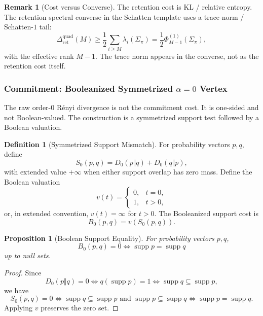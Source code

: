 \documentclass[12pt]{article}
\newtheorem{proposition}[theorem]{Proposition}
\theoremstyle{definition}
\newtheorem{definition}[theorem]{Definition}
\newtheorem{remark}[theorem]{Remark}
\DeclareMathOperator{\supp}{supp}
\newcommand{\RetQuad}{\Delta_{\mathrm{ret}}^{\mathrm{quad}}}
\newcommand{\Ren}[1]{D_{#1}}
\begin{document}
\begin{remark}[Cost versus Converse]
\label{rem:retention-cost-converse}
The retention cost is KL / relative entropy.  The retention spectral converse
in the Schatten template uses a trace-norm / Schatten-$1$ tail:
\[
\RetQuad(M)
\ge
\frac12
\sum_{i\ge M}
\lambda_i(\Sigma_\pi)
=
\frac12
\Phi^{(1)}_{M-1}(\Sigma_\pi),
\]
with the effective rank $M-1$.  The trace norm appears in the converse, not as
the retention cost itself.
\end{remark}

\subsubsection{Commitment: Booleanized Symmetrized $\alpha=0$ Vertex}
\label{subsubsec:exponent-commitment}

The raw order-$0$ R\'enyi divergence is not the commitment cost.  It is
one-sided and not Boolean-valued.  The construction is a symmetrized support
test followed by a Boolean valuation.

\begin{definition}[Symmetrized Support Mismatch]
\label{def:sym-support}
For probability vectors $p,q$, define
\[
S_0(p,q)
=
\Ren{0}(p\Vert q)+\Ren{0}(q\Vert p),
\]
with extended value $+\infty$ when either support overlap has zero mass.
Define the Boolean valuation
\[
v(t)
=
\begin{cases}
0,& t=0,\\
1,& t>0,
\end{cases}
\]
or, in extended convention, $v(t)=\infty$ for $t>0$.  The Booleanized support
cost is
\[
B_0(p,q)
=
v(S_0(p,q)).
\]
\end{definition}

\begin{proposition}[Boolean Support Equality]
\label{prop:B0}
For probability vectors $p,q$,
\[
B_0(p,q)=0
\iff
\supp p=\supp q
\]
up to null sets.
\end{proposition}

\begin{proof}
Since
\[
\Ren{0}(p\Vert q)=0
\iff
q(\supp p)=1
\iff
\supp q\subseteq\supp p,
\]
we have
\[
S_0(p,q)=0
\iff
\supp q\subseteq\supp p
\text{ and }
\supp p\subseteq\supp q
\iff
\supp p=\supp q.
\]
Applying $v$ preserves the zero set.
\end{proof}
\end{document}
